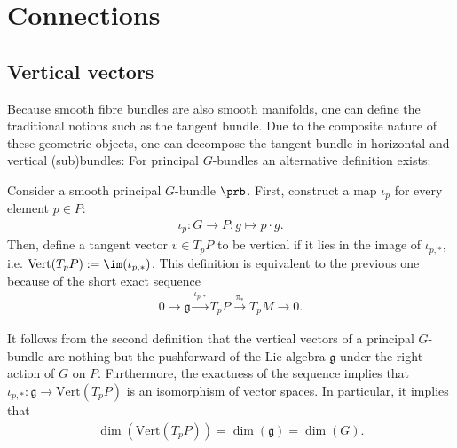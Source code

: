 \section{Connections}\label{section:connections}
\subsection{Vertical vectors}

    Because smooth fibre bundles are also smooth manifolds, one can define the traditional notions such as the tangent bundle. Due to the composite nature of these geometric objects, one can decompose the tangent bundle in horizontal and vertical (sub)bundles:
    For principal $G$-bundles an alternative definition exists:
    \begin{adefinition}
        Consider a smooth principal $G$-bundle $\prb$. First, construct a map $\iota_p$ for every element $p\in P$:
        \begin{gather}
            \iota_p:G\rightarrow P:g\mapsto p\cdot g.
        \end{gather}
        Then, define a tangent vector $v\in T_p P$ to be vertical if it lies in the image of $\iota_{p,\ast}$, i.e. $\mathrm{Vert}(T_pP) := \im(\iota_{p,\ast})$. This definition is equivalent to the previous one because of the short exact sequence
        \begin{gather}
            \label{bundle:principal_bundle_exact_sequence}
            0\longrightarrow\mathfrak{g}\overset{\iota_{p,\ast}}{\longrightarrow}T_pP\overset{\pi_\ast}{\longrightarrow}T_pM\longrightarrow0.
        \end{gather}
    \end{adefinition}

    \begin{property}\label{bundle:vertical_dimension}
        It follows from the second definition that the vertical vectors of a principal $G$-bundle are nothing but the pushforward of the Lie algebra $\mathfrak{g}$ under the right action of $G$ on $P$. Furthermore, the exactness of the sequence implies that $\iota_{p,\ast}:\mathfrak{g}\rightarrow\mathrm{Vert}(T_pP)$ is an isomorphism of vector spaces. In particular, it implies that
        \begin{gather}
            \dim(\mathrm{Vert}(T_pP)) = \dim(\mathfrak{g}) = \dim(G).
        \end{gather}
    \end{property}

